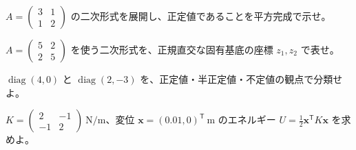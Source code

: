 \documentclass[11pt]{article}
\begin{document}

\problem[展開と平方完成]
$A=\begin{pmatrix}3&1\\1&2\end{pmatrix}$ の二次形式を展開し、正定値であることを平方完成で示せ。
\workspace{38mm}

\problem[主軸変換]
$A=\begin{pmatrix}5&2\\2&5\end{pmatrix}$ を使う二次形式を、正規直交な固有基底の座標 $z_1,z_2$ で表せ。
\workspace{38mm}
\newpage

\problem[符号の分類]
$\operatorname{diag}(4,0)$ と $\operatorname{diag}(2,-3)$ を、正定値・半正定値・不定値の観点で分類せよ。
\workspace{38mm}

\problem[ばねのエネルギー]
$K=\begin{pmatrix}2&-1\\-1&2\end{pmatrix}\ \mathrm{N/m}$、変位 $\boldsymbol x=(0.01,0)^{\mathsf T}\ \mathrm m$ のエネルギー $U=\frac12\boldsymbol x^{\mathsf T}K\boldsymbol x$ を求めよ。
\workspace{38mm}
\end{document}
